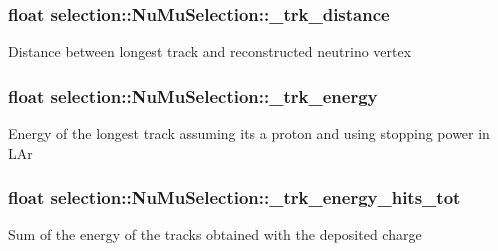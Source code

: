 \subsubsection[{\texorpdfstring{\+\_\+trk\+\_\+distance}{_trk_distance}}]{\setlength{\rightskip}{0pt plus 5cm}float selection\+::\+Nu\+Mu\+Selection\+::\+\_\+trk\+\_\+distance\hspace{0.3cm}{\ttfamily [private]}}\hypertarget{classselection_1_1NuMuSelection_a4d2e1ceec2811a4493f964212b744e26}{}\label{classselection_1_1NuMuSelection_a4d2e1ceec2811a4493f964212b744e26}
Distance between longest track and reconstructed neutrino vertex 
\subsubsection[{\texorpdfstring{\+\_\+trk\+\_\+energy}{_trk_energy}}]{\setlength{\rightskip}{0pt plus 5cm}float selection\+::\+Nu\+Mu\+Selection\+::\+\_\+trk\+\_\+energy\hspace{0.3cm}{\ttfamily [private]}}\hypertarget{classselection_1_1NuMuSelection_a505f81bb9d920d0304d988a2f3fadbc2}{}\label{classselection_1_1NuMuSelection_a505f81bb9d920d0304d988a2f3fadbc2}
Energy of the longest track assuming it\textquotesingle{}s a proton and using stopping power in L\+Ar 
\subsubsection[{\texorpdfstring{\+\_\+trk\+\_\+energy\+\_\+hits\+\_\+tot}{_trk_energy_hits_tot}}]{\setlength{\rightskip}{0pt plus 5cm}float selection\+::\+Nu\+Mu\+Selection\+::\+\_\+trk\+\_\+energy\+\_\+hits\+\_\+tot\hspace{0.3cm}{\ttfamily [private]}}\hypertarget{classselection_1_1NuMuSelection_a62b2fc85963f5b8c09b9a6306afbb84a}{}\label{classselection_1_1NuMuSelection_a62b2fc85963f5b8c09b9a6306afbb84a}
Sum of the energy of the tracks obtained with the deposited charge 
